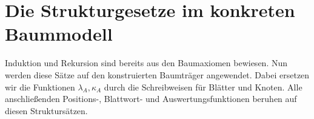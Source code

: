 \documentclass[main.tex]{subfiles}
\begin{document}
\begin{tabproofsplitwide}
\end{tabproofsplitwide}





\noindent\begin{minipage}{\linewidth}
\end{minipage}\par



\section{Die Strukturgesetze im konkreten Baummodell}

Induktion und Rekursion sind bereits aus den Baumaxiomen bewiesen.
Nun werden diese Sätze auf den konstruierten Baumträger angewendet.
Dabei ersetzen wir die Funktionen \(\lambda_A,\kappa_A\) durch
die Schreibweisen für Blätter und Knoten. Alle anschließenden
Positions-, Blattwort- und Auswertungsfunktionen beruhen auf diesen
Struktursätzen.

\noindent\begin{minipage}{\linewidth}
\end{minipage}\par


\end{document}
